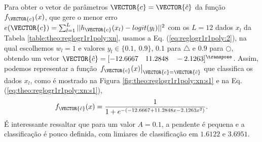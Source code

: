 \begin{SolutionT}\label{sol:theo:reglogr1r1poly:s1}
Para obter o vetor de parâmetros $\VECTOR{c}=\VECTOR{\hat{c}}$ da função $f_{\VECTOR{c}}(x)$, 
que gere o menor erro $e(\VECTOR{c}) =   \sum_{l=1}^{L} ||h_{\VECTOR{c}}(x_l)-logit(y_l)||^2$
com os $L=12$ dados $x_l$ da Tabela \ref{table:theo:reglogr1r1poly:xn},
usamos a Eq. (\ref{eq:reglogr1r1poly:2}), na qual escolhemos $w_l=1$ e valores $y_l \in \{0.1,~ 0.9\}$,
$0.1$ para $\bigtriangleup$ e $0.9$ para $\bigcirc$,
obtendo um vetor $\VECTOR{\hat{c}}=[-12.6667\quad 11.2848\quad -2.1263]^{\transpose}$.
Assim, podemos representar a função 
$\left.f_{\VECTOR{c}}(x)\right|_{\VECTOR{c}=\VECTOR{\hat{c}}}$ que classifica os dados $x_l$, 
como é mostrado na Figura \ref{fig:theo:reglogr1r1poly:xn:s1} e na Eq. (\ref{eq:theo:reglogr1r1poly:xn:s1}),
\begin{equation}\label{eq:theo:reglogr1r1poly:xn:s1}
f_{\VECTOR{\hat{c}}}(x)= \frac{1}{1+e^{-(-12.6667  +11.2848 x  -2.1263 x^2)}}.
\end{equation}
É interessante ressaltar que para um valor $A=0.1$, a pendente é pequena e a classificação é pouco definida,
com limiares de classificação em $1.6122$ e $3.6951$.
\end{SolutionT}

